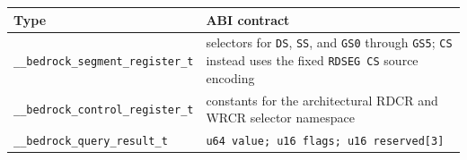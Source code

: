 \begingroup\footnotesize
\setlength{\tabcolsep}{2pt}
\begin{longtable}{@{}p{2.05in}p{3.45in}@{}}
\toprule
\textbf{Type} & \textbf{ABI contract}\\
\midrule
\endhead
\texttt{\_\_bedrock\_segment\_register\_t} & selectors for \texttt{DS}, \texttt{SS}, and \texttt{GS0} through \texttt{GS5}; \texttt{CS} instead uses the fixed \texttt{RDSEG CS} source encoding\\
\texttt{\_\_bedrock\_control\_register\_t} & constants for the architectural RDCR and WRCR selector namespace\\
\texttt{\_\_bedrock\_query\_result\_t} & \texttt{u64 value; u16 flags; u16 reserved[3]}\\
\bottomrule
\end{longtable}
\endgroup
